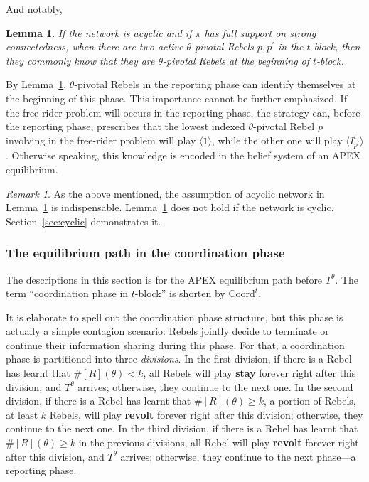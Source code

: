 \documentclass[12pt,letter]{article}
\newcommand{\Kappa}{\mathrm{Coord}}
\newtheorem{lemma}{Lemma}[section]
\theoremstyle{definition}
\theoremstyle{remark}
\newtheorem*{remark}{Remark}
\theoremstyle{claim}
\begin{document}
And notably,

\begin{lemma}
\label{lemman_pivotals_CK}
If the network is acyclic and if $\pi$ has full support on strong connectedness, when there are two active $\theta$-pivotal Rebels $p,p^{'}$ in the $t$-block, then they commonly know that they are $\theta$-pivotal Rebels at the beginning of $t$-block.
\end{lemma}

By Lemma~\ref{lemman_pivotals_CK}, $\theta$-pivotal Rebels in the reporting phase can identify themselves at the beginning of this phase. This importance cannot be further emphasized. If the free-rider problem will occurs in the reporting phase, the strategy can, before the reporting phase, prescribes that the lowest indexed $\theta$-pivotal Rebel $p$ involving in the free-rider problem will play $\langle 1 \rangle$, while the other one will play $\langle I^t_{p^{'}} \rangle$. Otherwise speaking, this knowledge is encoded in the belief system of an APEX equilibrium. 

\begin{remark}
As the above mentioned, the assumption of acyclic network in Lemma~\ref{lemman_pivotals_CK} is indispensable. Lemma~\ref{lemman_pivotals_CK} does not hold if the network is cyclic. Section~\ref{sec:cyclic} demonstrates it.
\end{remark}






\subsubsection{The equilibrium path in the coordination phase}
\label{sec:eq_cd}
The descriptions in this section is for the APEX equilibrium path {before} $T^{\theta}$. The term ``coordination phase in $t$-block'' is shorten by $\Kappa^{t}$.  

It is elaborate to spell out the coordination phase structure, but this phase is actually a simple contagion scenario: Rebels jointly decide to terminate or continue their information sharing during this phase. For that, a coordination phase is partitioned into three \textit{divisions}. In the first division, if there is a Rebel has learnt that $\#[R](\theta)<k$, all Rebels will play \textbf{stay} forever right after this division, and $T^{\theta}$ arrives; otherwise, they continue to the next one. In the second division, if there is a Rebel has learnt that $\#[R](\theta)\geq k$, a portion of Rebels, at least $k$ Rebels, will play \textbf{revolt} forever right after this division; otherwise, they continue to the next one. In the third division, if there is a Rebel has learnt that $\#[R](\theta)\geq k$ in the previous divisions, all Rebel will play \textbf{revolt} forever right after this division, and $T^{\theta}$ arrives; otherwise, they continue to the next phase---a reporting phase.
\end{document}
